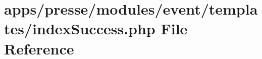 \hypertarget{presse_2modules_2event_2templates_2index_success_8php}{\section{apps/presse/modules/event/templates/index\-Success.php File Reference}
\label{presse_2modules_2event_2templates_2index_success_8php}
}
